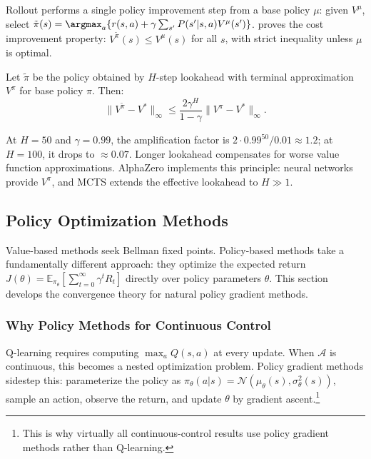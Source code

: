 Rollout performs a single policy improvement step from a base policy $\mu$: given $V^\mu$, select $\tilde{\pi}(s) = \argmax_a \{ r(s,a) + \gamma \sum_{s'} P(s'|s,a) V^\mu(s') \}$. \citet{bertsekas2022} proves the cost improvement property: $V^{\tilde{\pi}}(s) \leq V^\mu(s)$ for all $s$, with strict inequality unless $\mu$ is optimal.

\begin{theorem}
\label{thm:rollout_error}
Let $\tilde{\pi}$ be the policy obtained by $H$-step lookahead with terminal approximation $V^\pi$ for base policy $\pi$. Then:
\begin{equation}
\|V^{\tilde{\pi}} - V^*\|_\infty \leq \frac{2\gamma^H}{1-\gamma} \|V^\pi - V^*\|_\infty.
\end{equation}
\end{theorem}

At $H=50$ and $\gamma=0.99$, the amplification factor is $2 \cdot 0.99^{50} / 0.01 \approx 1.2$; at $H=100$, it drops to $\approx 0.07$. Longer lookahead compensates for worse value function approximations. AlphaZero implements this principle: neural networks provide $V^\pi$, and MCTS extends the effective lookahead to $H \gg 1$.


\subsection{Policy Optimization Methods}
\label{sec:policy_optimization}

Value-based methods seek Bellman fixed points. Policy-based methods take a fundamentally different approach: they optimize the expected return $J(\theta) = \mathbb{E}_{\pi_\theta}[\sum_{t=0}^\infty \gamma^t R_t]$ directly over policy parameters $\theta$. This section develops the convergence theory for natural policy gradient methods.

\subsubsection{Why Policy Methods for Continuous Control}

Q-learning requires computing $\max_a Q(s,a)$ at every update. When $\mathcal{A}$ is continuous, this becomes a nested optimization problem. Policy gradient methods sidestep this: parameterize the policy as $\pi_\theta(a|s) = \mathcal{N}(\mu_\theta(s), \sigma_\theta^2(s))$, sample an action, observe the return, and update $\theta$ by gradient ascent.\footnote{This is why virtually all continuous-control results use policy gradient methods rather than Q-learning.}

